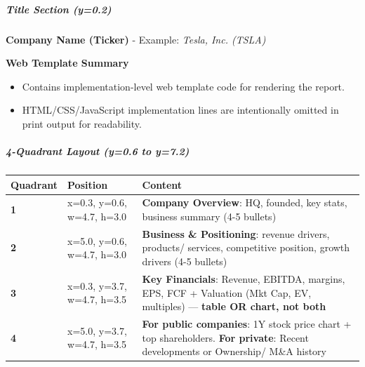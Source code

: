 \documentclass[11pt]{article}
\begin{document}
\subparagraph{Title Section (y=0.2)}\mbox{}\par
\textbf{Company Name (Ticker)} - Example: \emph{Tesla, Inc. (TSLA)}

\textbf{Web Template Summary}
\begin{itemize}[leftmargin=*,itemsep=2pt,topsep=2pt]
\item {} Contains implementation-level web template code for rendering the report.
\item {} HTML/CSS/JavaScript implementation lines are intentionally omitted in print output for readability.
\end{itemize}

\subparagraph{4-Quadrant Layout (y=0.6 to y=7.2)}\mbox{}\par

\begingroup
\small
\setlength{\tabcolsep}{2pt}
\begin{longtable}{>{\RaggedRight\arraybackslash\hspace{0pt}}p{}>{\RaggedRight\arraybackslash\hspace{0pt}}p{}>{\RaggedRight\arraybackslash\hspace{0pt}}p{}}
\toprule
{} \textbf{Quadrant} & \textbf{Position} & \textbf{Content} \\
\midrule
{} \textbf{1} & x=0.3, y=0.6, w=4.7, h=3.0 & \textbf{Company Overview}: HQ, founded, key stats, business summary (4-5 bullets) \\
{} \textbf{2} & x=5.0, y=0.6, w=4.7, h=3.0 & \textbf{Business \& Positioning}: revenue drivers, products/ services, competitive position, growth drivers (4-5 bullets) \\
{} \textbf{3} & x=0.3, y=3.7, w=4.7, h=3.5 & \textbf{Key Financials}: Revenue, EBITDA, margins, EPS, FCF + Valuation (Mkt Cap, EV, multiples) — \textbf{table OR chart, not both} \\
{} \textbf{4} & x=5.0, y=3.7, w=4.7, h=3.5 & \textbf{For public companies}: 1Y stock price chart + top shareholders. \textbf{For private}: Recent developments or Ownership/ M\&A history \\
\bottomrule
\end{longtable}
\endgroup
\end{document}
